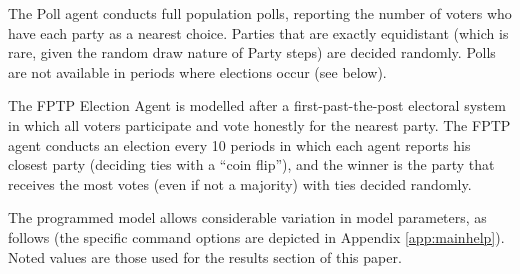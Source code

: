 \documentclass[12pt]{article}
\numberwithin{equation}{subsection}
\begin{document}
The Poll agent conducts full population polls, reporting the number of voters who have each party as
a nearest choice.  Parties that are exactly equidistant (which is rare, given the random draw nature
of Party steps) are decided randomly.  Polls are not available in periods where elections occur (see
below).

The FPTP Election Agent is modelled after a first-past-the-post electoral system in which all voters
participate and vote honestly for the nearest party.  The FPTP agent conducts an election every 10
periods in which each agent reports his closest party (deciding ties with a ``coin flip''), and the
winner is the party that receives the most votes (even if not a majority) with ties decided randomly.

The programmed model allows considerable variation in model parameters, as follows (the specific
command options are depicted in Appendix \ref{app:mainhelp}).  Noted values are those used for the
results section of this paper.
\end{document}
